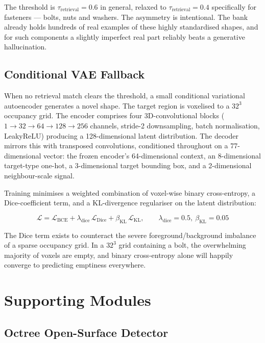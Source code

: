 \documentclass[12pt,oneside,a4paper]{report}
\begin{document}
The threshold is $\tau_{\text{retrieval}}=0.6$ in general, relaxed to
$\tau_{\text{retrieval}}=0.4$ specifically for fasteners --- bolts, nuts and
washers. The asymmetry is intentional. The bank already holds hundreds of
real examples of these highly standardised shapes, and for such components a
slightly imperfect real part reliably beats a generative hallucination.

\subsection{Conditional VAE Fallback}

When no retrieval match clears the threshold, a small conditional variational
autoencoder generates a novel shape. The target region is voxelised to a
$32^3$ occupancy grid. The encoder comprises four 3D-convolutional blocks
($1\!\to\!32\!\to\!64\!\to\!128\!\to\!256$ channels, stride-2 downsampling,
batch normalisation, LeakyReLU) producing a 128-dimensional latent
distribution. The decoder mirrors this with transposed convolutions,
conditioned throughout on a 77-dimensional vector: the frozen encoder's
64-dimensional context, an 8-dimensional target-type one-hot, a
3-dimensional target bounding box, and a 2-dimensional neighbour-scale
signal.

Training minimises a weighted combination of voxel-wise binary cross-entropy,
a Dice-coefficient term, and a KL-divergence regulariser on the latent
distribution:

\begin{equation}
\mathcal{L} = \mathcal{L}_{\text{BCE}}
+ \lambda_{\text{dice}}\,\mathcal{L}_{\text{Dice}}
+ \beta_{\text{KL}}\,\mathcal{L}_{\text{KL}},
\qquad \lambda_{\text{dice}}=0.5,\ \beta_{\text{KL}}=0.05
\label{eq:vaeloss}
\end{equation}

The Dice term exists to counteract the severe foreground/background imbalance
of a sparse occupancy grid. In a $32^3$ grid containing a bolt, the
overwhelming majority of voxels are empty, and binary cross-entropy alone
will happily converge to predicting emptiness everywhere.

\section{Supporting Modules}

\subsection{Octree Open-Surface Detector}
\end{document}

